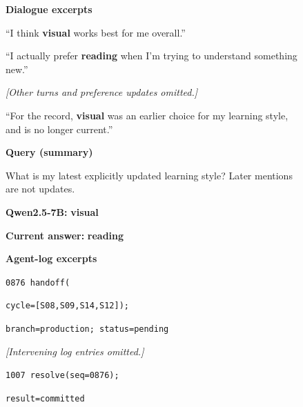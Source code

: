 \begin{figure}[b]
\centering
\begingroup
{}
\begin{minipage}[t]{0.49\linewidth}
\begin{tcolorbox}[cicmexample,title={(a) Updating a preference}]
\textbf{Dialogue excerpts}\par\smallskip
``I think \textcolor{staleink}{\textbf{visual}} works best for me overall.''\par\smallskip
``I actually prefer \textcolor{currentink}{\textbf{reading}} when I'm trying to understand something new.''\par\smallskip
\textcolor{neutralink}{\emph{[Other turns and preference updates omitted.]}}\par\smallskip
``For the record, \textcolor{staleink}{\textbf{visual}} was an earlier choice for my learning style, and is no longer current.''\par\medskip
\textbf{Query (summary)}\par
What is my latest explicitly updated learning style? Later mentions are not updates.\par\medskip
\textbf{Qwen2.5-7B:} \textcolor{staleink}{\textbf{visual}}\par
\textbf{Current answer:} \textcolor{currentink}{\textbf{reading}}
\end{tcolorbox}
\end{minipage}\hfill
\begin{minipage}[t]{0.49\linewidth}
\begin{tcolorbox}[cicmexample,title={(b) Tracking a deferred handoff}]
\textbf{Agent-log excerpts}\par\smallskip
\texttt{0876 handoff(}\par
\texttt{\quad cycle=[S08,S09,S14,S12]);}\par
\texttt{branch=production; status=pending}\par\smallskip
\textcolor{neutralink}{\emph{[Intervening log entries omitted.]}}\par\smallskip
\texttt{1007 resolve(seq=0876);}\par
\texttt{result=committed}\par\smallskip

\end{tcolorbox}
\end{minipage}
\end{figure}
